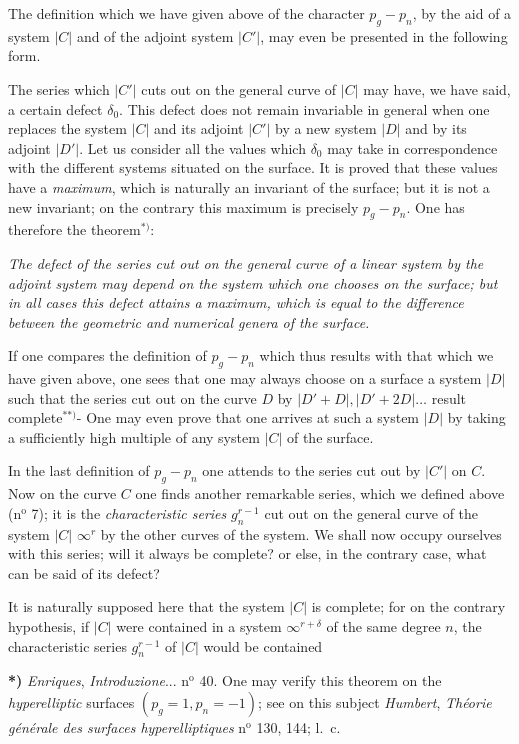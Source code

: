 \documentclass{article}
\begin{document}
The definition which we have given above of the character $p_{g} - p_{n}$, by the aid of a system $|C|$ and of the adjoint system $|C'|$, may even be presented in the following form.

The series which $|C'|$ cuts out on the general curve of $|C|$ may have, we have said, a certain defect $\delta_{0}$. This defect does not remain invariable in general when one replaces the system $|C|$ and its adjoint $|C'|$ by a new system $|D|$ and by its adjoint $|D'|$. Let us consider all the values which $\delta_{0}$ may take in correspondence with the different systems situated on the surface. It is proved that these values have a \emph{maximum}, which is naturally an invariant of the surface; but it is not a new invariant; on the contrary this maximum is precisely $p_{g} - p_{n}$. One has therefore the theorem${}^{*)}$:

\emph{The defect of the series cut out on the general curve of a linear system by the adjoint system may depend on the system which one chooses on the surface; but in all cases this defect attains a maximum, which is equal to the difference between the geometric and numerical genera of the surface.}

If one compares the definition of $p_{g} - p_{n}$ which thus results with that which we have given above, one sees that one may always choose on a surface a system $|D|$ such that the series cut out on the curve $D$ by $|D'+D|, |D'+2D| \ldots$ result complete${}^{**)}$- One may even prove that one arrives at such a system $|D|$ by taking a sufficiently high multiple of any system $|C|$ of the surface.

In the last definition of $p_{g} - p_{n}$ one attends to the series cut out by $|C'|$ on $C$. Now on the curve $C$ one finds another remarkable series, which we defined above (n${}^{\text{o}}$ 7); it is the \emph{characteristic series} $g_{n}^{r-1}$ cut out on the general curve of the system $|C|$ $\infty^{r}$ by the other curves of the system. We shall now occupy ourselves with this series; will it always be complete? or else, in the contrary case, what can be said of its defect?

It is naturally supposed here that the system $|C|$ is complete; for on the contrary hypothesis, if $|C|$ were contained in a system $\infty^{r+\delta}$ of the same degree $n$, the characteristic series $g_{n}^{r-1}$ of $|C|$ would be contained

\textbf{*)} \emph{Enriques}, \emph{Introduzione}... n${}^{\text{o}}$ 40. One may verify this theorem on the \emph{hyperelliptic} surfaces $(p_{g} = 1, p_{n} = -1)$; see on this subject \emph{Humbert}, \emph{Théorie générale des surfaces hyperelliptiques} n${}^{\text{o}}$ 130, 144; l.\ c.
\end{document}
